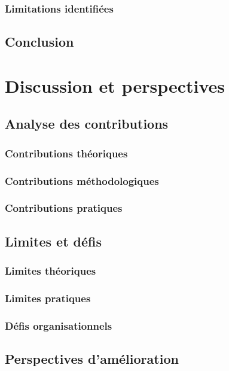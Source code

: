 \documentclass[a4paper,12pt]{article}
\begin{document}
\subsubsection{Limitations identifiées}
\label{sec:org0e6c7b4}
\subsection{Conclusion}
\label{sec:org890e1b2}
\clearpage
\section{Discussion et perspectives}
\label{sec:org99b72cf}
\subsection{Analyse des contributions}
\label{sec:org12562bf}
\subsubsection{Contributions théoriques}
\label{sec:orgffee61f}
\subsubsection{Contributions méthodologiques}
\label{sec:org2f7ed58}
\subsubsection{Contributions pratiques}
\label{sec:orgd382bba}
\subsection{Limites et défis}
\label{sec:orge9965d0}
\subsubsection{Limites théoriques}
\label{sec:orgbffb375}
\subsubsection{Limites pratiques}
\label{sec:orgafdf066}
\subsubsection{Défis organisationnels}
\label{sec:org6a64eaf}
\subsection{Perspectives d'amélioration}
\label{sec:orgd2f0c10}
\end{document}
